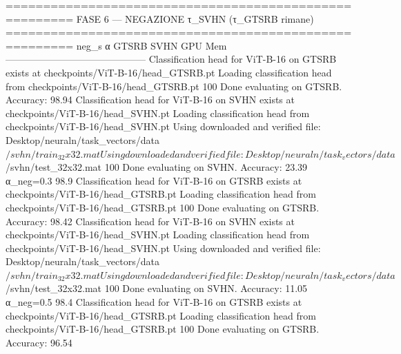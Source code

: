 =======================================================
  FASE 6 — NEGAZIONE τ_SVHN (τ_GTSRB rimane)
=======================================================
  neg_s α           GTSRB     SVHN    GPU Mem
  --------------------------------------------
Classification head for ViT-B-16 on GTSRB exists at checkpoints/ViT-B-16/head_GTSRB.pt
Loading classification head from checkpoints/ViT-B-16/head_GTSRB.pt
100%
Done evaluating on GTSRB. Accuracy: 98.94%
Classification head for ViT-B-16 on SVHN exists at checkpoints/ViT-B-16/head_SVHN.pt
Loading classification head from checkpoints/ViT-B-16/head_SVHN.pt
Using downloaded and verified file: Desktop/neuraln/task_vectors/data$/svhn/train_32x32.mat
Using downloaded and verified file: Desktop/neuraln/task_vectors/data$/svhn/test_32x32.mat
100%
Done evaluating on SVHN. Accuracy: 23.39%
  α_neg=0.3         98.9%
Classification head for ViT-B-16 on GTSRB exists at checkpoints/ViT-B-16/head_GTSRB.pt
Loading classification head from checkpoints/ViT-B-16/head_GTSRB.pt
100%
Done evaluating on GTSRB. Accuracy: 98.42%
Classification head for ViT-B-16 on SVHN exists at checkpoints/ViT-B-16/head_SVHN.pt
Loading classification head from checkpoints/ViT-B-16/head_SVHN.pt
Using downloaded and verified file: Desktop/neuraln/task_vectors/data$/svhn/train_32x32.mat
Using downloaded and verified file: Desktop/neuraln/task_vectors/data$/svhn/test_32x32.mat
100%
Done evaluating on SVHN. Accuracy: 11.05%
  α_neg=0.5         98.4%
Classification head for ViT-B-16 on GTSRB exists at checkpoints/ViT-B-16/head_GTSRB.pt
Loading classification head from checkpoints/ViT-B-16/head_GTSRB.pt
100%
Done evaluating on GTSRB. Accuracy: 96.54%
